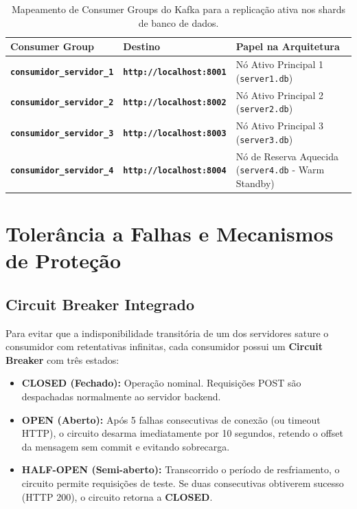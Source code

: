 \documentclass[11pt,a4paper]{article}
\begin{document}
\begin{table}[H]
\centering
\small
\begin{tabularx}{\linewidth}{>{\bfseries}p{4.2cm} >{\bfseries}p{3.2cm} >{\raggedright\arraybackslash}X}
\toprule
Consumer Group & Destino & Papel na Arquitetura \\
\midrule
\texttt{consumidor\_servidor\_1} & \texttt{http://localhost:8001} & Nó Ativo Principal 1 (\texttt{server1.db}) \\
\texttt{consumidor\_servidor\_2} & \texttt{http://localhost:8002} & Nó Ativo Principal 2 (\texttt{server2.db}) \\
\texttt{consumidor\_servidor\_3} & \texttt{http://localhost:8003} & Nó Ativo Principal 3 (\texttt{server3.db}) \\
\texttt{consumidor\_servidor\_4} & \texttt{http://localhost:8004} & Nó de Reserva Aquecida (\texttt{server4.db} - Warm Standby) \\
\bottomrule
\end{tabularx}
\caption{Mapeamento de Consumer Groups do Kafka para a replicação ativa nos shards de banco de dados.}
\label{tab:consumer_groups}
\end{table}

\section{Tolerância a Falhas e Mecanismos de Proteção}

\subsection{Circuit Breaker Integrado}
Para evitar que a indisponibilidade transitória de um dos servidores sature o consumidor com retentativas infinitas, cada consumidor possui um \textbf{Circuit Breaker} com três estados:
\begin{itemize}
    \item \textbf{CLOSED (Fechado):} Operação nominal. Requisições POST são despachadas normalmente ao servidor backend.
    \item \textbf{OPEN (Aberto):} Após 5 falhas consecutivas de conexão (ou timeout HTTP), o circuito desarma imediatamente por 10 segundos, retendo o offset da mensagem sem commit e evitando sobrecarga.
    \item \textbf{HALF-OPEN (Semi-aberto):} Transcorrido o período de resfriamento, o circuito permite requisições de teste. Se duas consecutivas obtiverem sucesso (HTTP 200), o circuito retorna a \textbf{CLOSED}.
\end{itemize}
\end{document}
